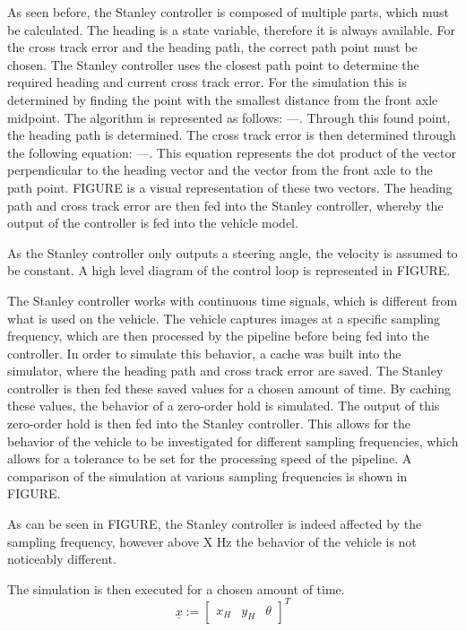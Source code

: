 \documentclass[arbeit=studie,oneside,BCOR=12mm]{ArbeitRST}
\begin{document}
As seen before, the Stanley controller is composed of multiple parts, which
must be calculated. The heading is a state variable, therefore it is always
available. For the cross track error and the heading path, the correct path
point must be chosen. The Stanley controller uses the closest path point to
determine the required heading and current cross track error. For the
simulation this is determined by finding the point with the smallest distance
from the front axle midpoint. The algorithm is represented as follows: 
---.
Through this found point, the heading path is determined. The cross track error
is then determined through the following equation: 
---. 
This equation
represents the dot product of the vector perpendicular to the heading vector
and the vector from the front axle to the path point. FIGURE is a visual
representation of these two vectors. The heading path and cross track error are
then fed into the Stanley controller, whereby the output of the controller is
fed into the vehicle model.

As the Stanley controller only outputs a steering angle, the velocity is
assumed to be constant. A high level diagram of the control loop is represented
in FIGURE.

The Stanley controller works with continuous time signals, which is different
from what is used on the vehicle. The vehicle captures images at a specific
sampling frequency, which are then processed by the pipeline before being fed
into the controller. In order to simulate this behavior, a cache was built into
the simulator, where the heading path and cross track error are saved. The
Stanley controller is then fed these saved values for a chosen amount of time.
By caching these values, the behavior of a zero-order hold is simulated. The
output of this zero-order hold is then fed into the Stanley controller. This
allows for the behavior of the vehicle to be investigated for different
sampling frequencies, which allows for a tolerance to be set for the processing
speed of the pipeline. A comparison of the simulation at various sampling
frequencies is shown in FIGURE.

As can be seen in FIGURE, the Stanley controller is indeed affected by the
sampling frequency, however above X Hz the behavior of the vehicle is not
noticeably different. 

The simulation is then executed for a chosen amount of time. 
\begin{equation} 
  \underline{x} := 
  \begin{bmatrix}
    x_H & y_H & \theta
  \end{bmatrix}^T 
  \label{Zustandsvektor}
\end{equation}
\end{document}
